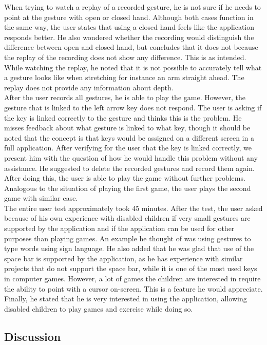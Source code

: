 When trying to watch a replay of a recorded gesture, he is not sure if he needs to point at the gesture with open or closed hand. Although both cases function in the same way, the user states that using a closed hand feels like the application responds better. He also wondered whether the recording would distinguish the difference between open and closed hand, but concludes that it does not because the replay of the recording does not show any difference. This is as intended. While watching the replay, he noted that it is not possible to accurately tell what a gesture looks like when stretching for instance an arm straight ahead. The replay does not provide any information about depth.\\

After the user records all gestures, he is able to play the game. However, the gesture that is linked to the left arrow key does not respond. The user is asking if the key is linked correctly to the gesture and thinks this is the problem. He misses feedback about what gesture is linked to what key, though it should be noted that the concept is that keys would be assigned on a different screen in a full application. After verifying for the user that the key is linked correctly, we present him with the question of how he would handle this problem without any assistance. He suggested to delete the recorded gestures and record them again. After doing this, the user is able to play the game without further problems. Analogous to the situation of playing the first game, the user plays the second game with similar ease.\\

The entire user test approximately took 45 minutes. After the test, the user asked because of his own experience with disabled children if very small gestures are supported by the application and if the application can be used for other purposes than playing games. An example he thought of was using gestures to type words using sign language. He also added that he was glad that use of the space bar is supported by the application, as he has experience with similar projects that do not support the space bar, while it is one of the most used keys in computer games. However, a lot of games the children are interested in require the ability to point with a cursor on-screen. This is a feature he would appreciate. Finally, he stated that he is very interested in using the application, allowing disabled children to play games and exercise while doing so.


\subsection{Discussion}

